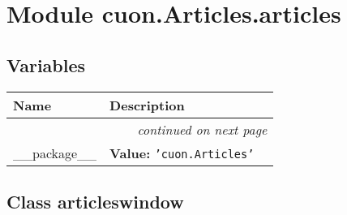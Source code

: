 %
%
%


\section{Module cuon.Articles.articles}

    \label{cuon:Articles:articles}


  \subsection{Variables}

    \vspace{-1cm}
\hspace{\varindent}\begin{longtable}{|p{\varnamewidth}|p{\vardescrwidth}|l}
\cline{1-2}
\cline{1-2} \centering \textbf{Name} & \centering \textbf{Description}& \\
\cline{1-2}
\endhead\cline{1-2}\multicolumn{3}{r}{\small\textit{continued on next page}}\\\endfoot\cline{1-2}
\endlastfoot\raggedright \_\-\_\-p\-a\-c\-k\-a\-g\-e\-\_\-\_\- & \raggedright \textbf{Value:} 
{\tt \texttt{'}\texttt{cuon.Articles}\texttt{'}}&\\
\cline{1-2}
\end{longtable}



\subsection{Class articleswindow}

